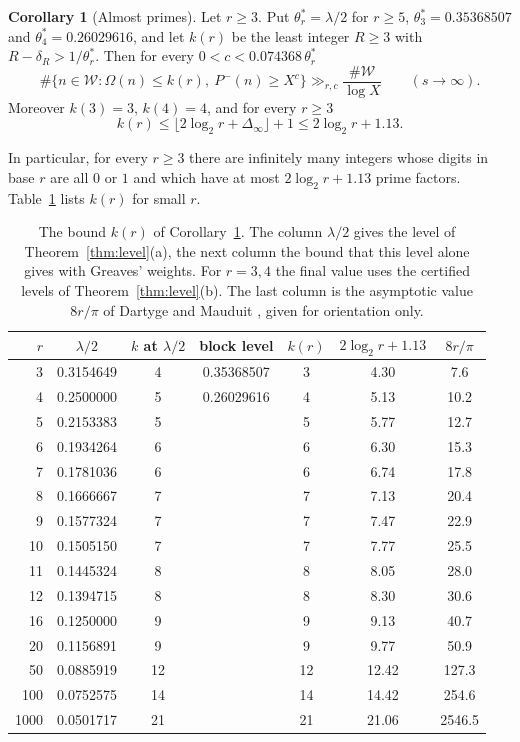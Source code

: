 \documentclass[11pt]{amsart}
\theoremstyle{definition}
\newtheorem{corollary}[theorem]{Corollary}
\numberwithin{equation}{section}
\newcommand{\WW}{\mathcal{W}}
\begin{document}
\begin{corollary}[Almost primes]\label{cor:almost}
Let $r\ge3$. Put $\theta^*_r=\lambda/2$ for $r\ge5$, $\theta^*_3=0.35368507$ and $\theta^*_4=0.26029616$, and let $k(r)$ be the least integer $R\ge3$ with $R-\delta_R>1/\theta^*_r$. Then for every $0<c<0.074368\,\theta^*_r$
\[
\#\{n\in\WW:\Omega(n)\le k(r),\ P^-(n)\ge X^{c}\}\gg_{r,c}\frac{\#\WW}{\log X}\qquad(s\to\infty).
\]
Moreover $k(3)=3$, $k(4)=4$, and for every $r\ge3$
\[
k(r)\le\bigl\lfloor2\log_2r+\Delta_\infty\bigr\rfloor+1\le2\log_2r+1.13.
\]
\end{corollary}

In particular, for every $r\ge3$ there are infinitely many integers whose digits in base $r$ are all $0$ or $1$ and which have at most $2\log_2r+1.13$ prime factors. Table~\ref{tab:k} lists $k(r)$ for small $r$.

\begin{table}[ht]
\caption{The bound $k(r)$ of Corollary~\ref{cor:almost}. The column $\lambda/2$ gives the level of Theorem~\ref{thm:level}(a), the next column the bound that this level alone gives with Greaves' weights. For $r=3,4$ the final value uses the certified levels of Theorem~\ref{thm:level}(b). The last column is the asymptotic value $8r/\pi$ of Dartyge and Mauduit \cite{DM00}, given for orientation only.}\label{tab:k}
\begin{tabular}{rcccccc}
\toprule
$r$ & $\lambda/2$ & $k$ at $\lambda/2$ & block level & $k(r)$ & $2\log_2r+1.13$ & $8r/\pi$\\
\midrule
3 & 0.3154649 & 4 & 0.35368507 & 3 & 4.30 & 7.6\\
4 & 0.2500000 & 5 & 0.26029616 & 4 & 5.13 & 10.2\\
5 & 0.2153383 & 5 & & 5 & 5.77 & 12.7\\
6 & 0.1934264 & 6 & & 6 & 6.30 & 15.3\\
7 & 0.1781036 & 6 & & 6 & 6.74 & 17.8\\
8 & 0.1666667 & 7 & & 7 & 7.13 & 20.4\\
9 & 0.1577324 & 7 & & 7 & 7.47 & 22.9\\
10 & 0.1505150 & 7 & & 7 & 7.77 & 25.5\\
11 & 0.1445324 & 8 & & 8 & 8.05 & 28.0\\
12 & 0.1394715 & 8 & & 8 & 8.30 & 30.6\\
16 & 0.1250000 & 9 & & 9 & 9.13 & 40.7\\
20 & 0.1156891 & 9 & & 9 & 9.77 & 50.9\\
50 & 0.0885919 & 12 & & 12 & 12.42 & 127.3\\
100 & 0.0752575 & 14 & & 14 & 14.42 & 254.6\\
1000 & 0.0501717 & 21 & & 21 & 21.06 & 2546.5\\
\bottomrule
\end{tabular}
\end{table}
\end{document}
